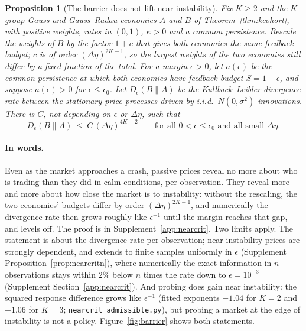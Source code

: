 \documentclass[12pt]{article}
\newtheorem{proposition}[theorem]{Proposition}
\theoremstyle{definition}
\theoremstyle{remark}
\begin{document}
\begin{proposition}[The barrier does not lift near instability]\label{prop:nearcrit}
Fix $K\ge2$ and the $K$-group Gauss and Gauss--Radau economies $A$ and $B$ of Theorem~\ref{thm:kcohort}, with positive weights, rates in $(0,1)$, $\kappa>0$ and a common persistence. Rescale the weights of $B$ by the factor $1+c$ that gives both economies the same feedback budget; $c$ is of order $(\Delta\eta)^{2K-1}$, so the largest weights of the two economies still differ by a fixed fraction of the total. For a margin $\epsilon>0$, let $a(\epsilon)$ be the common persistence at which both economies have feedback budget $S=1-\epsilon$, and suppose $a(\epsilon)>0$ for $\epsilon\le\epsilon_0$. Let $D_\epsilon(B\|A)$ be the Kullback--Leibler divergence rate between the stationary price processes driven by i.i.d.\ $N(0,\sigma^2)$ innovations. There is $C$, not depending on $\epsilon$ or $\Delta\eta$, such that
\[
D_\epsilon(B\|A)\ \le\ C\,(\Delta\eta)^{4K-2}\qquad\text{for all }0<\epsilon\le\epsilon_0\text{ and all small }\Delta\eta .
\]
\end{proposition}

\paragraph{In words.} Even as the market approaches a crash, passive prices reveal no more about who is trading than they did in calm conditions, per observation. They reveal more and more about how close the market is to instability: without the rescaling, the two economies' budgets differ by order $(\Delta\eta)^{2K-1}$, and numerically the divergence rate then grows roughly like $\epsilon^{-1}$ until the margin reaches that gap, and levels off. The proof is in Supplement~\ref{app:nearcrit}. Two limits apply. The statement is about the divergence rate per observation; near instability prices are strongly dependent, and extends to finite samples uniformly in $\epsilon$ (Supplement Proposition~\ref{prop:nearcritn}), where numerically the exact information in $n$ observations stays within $2\%$ below $n$ times the rate down to $\epsilon=10^{-3}$ (Supplement Section~\ref{app:nearcrit}). And probing does gain near instability: the squared response difference grows like $\epsilon^{-1}$ (fitted exponents $-1.04$ for $K=2$ and $-1.06$ for $K=3$; \nolinkurl{nearcrit_admissible.py}), but probing a market at the edge of instability is not a policy. Figure~\ref{fig:barrier} shows both statements.
\end{document}
